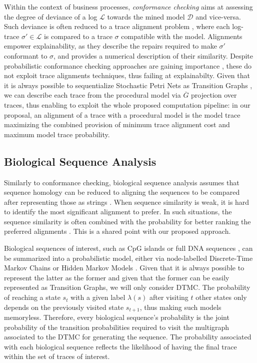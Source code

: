 Within the context of business processes, \textit{conformance checking} aims at assessing the degree of deviance of a log $\mathcal{L}$ towards the mined model $\mathcal{D}$ and vice-versa. Such deviance is often reduced to a  trace alignment problem \cite{DBLP:conf/edoc/AdriansyahDA11}, where each log-trace $\sigma'\in\mathcal{L}$ is compared to a trace $\sigma$ compatible with the model. Alignments empower explainability, as they describe the repairs required to make $\sigma'$ conformant to $\sigma$, and provides a numerical description of  their similarity.  Despite probabilistic conformance checking approaches are gaining importance \cite{DBLP:conf/bpm/LeemansSA19,DBLP:conf/icpm/PolyvyanyyK19,DBLP:journals/tosem/PolyvyanyySWCM20}, these do not exploit trace alignments techniques, thus failing at explainabilty. Given that it is always possible to sequentialize Stochastic Petri Nets as Transition Graphs \cite{MarsanCB84}, we can describe each trace from the procedural model via $\overline{G}$ projection over traces, thus enabling to exploit the whole proposed computation pipeline: in our proposal, an alignment of a trace with a procedural model is the model trace maximizing the combined provision of minimum trace alignment cost and maximum model trace probability.



\subsection{Biological Sequence Analysis}
Similarly to conformance checking, biological sequence analysis assumes that sequence homology can be reduced to aligning the sequences to be compared after representing those as strings \cite{durbin1998biological}. When sequence similarity is weak, it is hard to identify the most significant alignment to prefer. In such situations, the sequence similarity is often combined with the probability for better ranking the preferred alignments \cite{durbin1998biological}. This is a shared point with our proposed approach. 

Biological sequences of interest, such as CpG islands \cite{kxq005} or full DNA sequences \cite{BISHOP1986159}, can be summarized into a probabilistic model, either via node-labelled Discrete-Time Markov Chains \cite{RyabkoU08} or Hidden Markov Models \cite{Helske2018}. Given that it is always possible to represent the latter as the former \cite{DUPONT20051349} and given that the former can be easily represented as Transition Graphs, we will only consider DTMC. The probability of reaching a state $s_t$ with a given label $\lambda(s)$ after visiting $t$ other states only depends on the previously visited state $s_{t+1}$, thus making such models memoryless. Therefore, every biological sequence's probability is the joint probability of the transition probabilities required to visit the multigraph associated to the DTMC for generating the sequence. The probability associated with each biological sequence reflects the likelihood of having the final trace within the set of traces of interest. 


